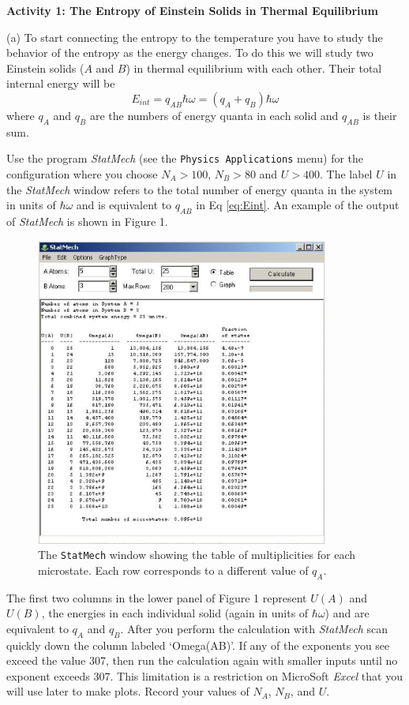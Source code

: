 \textbf{Activity 1: The Entropy of Einstein Solids in Thermal Equilibrium}

(a) To start connecting the entropy to the temperature you have to study the 
behavior of the entropy as the energy changes.
To do this we will study two Einstein solids ($A$ and $B$) in thermal equilibrium with 
each other.
Their total internal energy will be
\begin{equation}\label{eq:Eint}
E_{int} = q_{AB}\hbar \omega = (q_A + q_B) \hbar \omega
\end{equation}
where $q_A$ and $q_B$ are the numbers of energy quanta in each solid and $q_{AB}$ is 
their sum.

Use the program {\it StatMech} (see the {\tt Physics Applications} menu)
for the configuration where you choose $N_A > 100$, $N_B > 80$ and $U>400$.
The label $U$ in the {\it StatMech} window refers to the total number of energy quanta 
in the system
in units of $\hbar \omega$ and is equivalent to $q_{AB}$  in Eq \ref{eq:Eint}.
An example of the output of {\it StatMech} is shown in Figure 1.
\begin{figure}[ht!]
\begin{center}
\includegraphics[height=4.0in]{entropy_temperature/statmech1.eps}
\caption{The {\tt StatMech} window showing the table of multiplicities for each microstate.
Each row corresponds to a different value of $q_A$.}
\end{center}
\end{figure}
The first two columns in the lower panel of Figure 1 represent $U(A)$ and $U(B)$, 
the energies in each 
individual solid (again in units of $\hbar \omega$) and are equivalent to $q_A$ and $q_B$.
After you perform the calculation with {\it StatMech} scan quickly down the column
labeled `Omega(AB)'.
If any of the exponents you see exceed the value 307, then run the calculation again with 
smaller inputs until no exponent exceeds 307.
This limitation is a restriction on MicroSoft {\it Excel} that you will use later to make
plots.
Record your values of $N_A$, $N_B$, and $U$.
\vspace{15mm}

